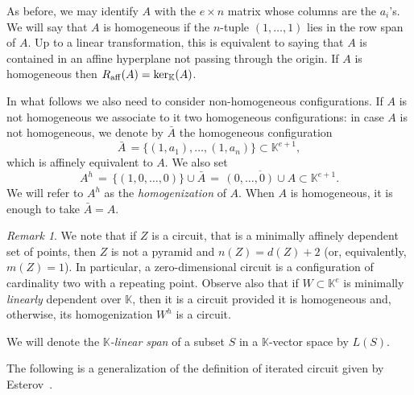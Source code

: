 \documentclass[11pt]{amsart}
\theoremstyle{plain}
\theoremstyle{definition}
\newcounter{remarks}
\theoremstyle{remark}
\newtheorem{remark}[remarks]{Remark}
\renewcommand{\k}{{\mathbb K}}
\numberwithin{equation}{section}
\begin{document}
As before, we may identify $A$ with the $e \times n$ matrix whose columns are the $a_i$'s. We will say that $A$ is homogeneous 
if the $n$-tuple $(1,\dots,1)$ lies in the row span of $A$. Up to a linear transformation, this is equivalent to saying that $A$ 
is contained in an affine hyperplane not passing through the origin. 
If $A$ is homogeneous then 
$R_{\rm aff}(A) = \ker_\k(A)$.  


In what follows we also need to consider non-homogeneous configurations.  If $A$ is not homogeneous we associate to it two homogeneous configurations:
in case $A$ is not homogeneous, we denote by $\bar{A}$ the homogeneous configuration
\begin{equation}\label{eq:overline}
\bar{A} \, = \{ (1,a_1), \dots, (1, a_{n})\} \subset \k^{e+1},
\end{equation}
which is affinely equivalent to $A$.   We also set 
\begin{equation}\label{def:Chom}
A^h  \, = \, \{(1, 0, \dots, 0)\} \cup \bar{A} \, = \, \overline{(0,\dots,0) \cup A}\subset \k^{e+1}.
\end{equation}
We will refer to $A^h$ as the {\em homogenization} of $A$. When $A$ is homogeneous, it is enough to take $\bar{A}=A$.

\begin{remark} \label{rem:circuit} We note that if $Z$ is a circuit, that is a minimally affinely dependent set of points, then $Z$ is not a pyramid and 
$n(Z) = d(Z)+2$ (or, equivalently, $m(Z)=1$).  In particular, a zero-dimensional circuit is a configuration of cardinality two with a repeating point.  
Observe also that if $W \subset \k^e$ is minimally {\em linearly} dependent over $\k$, then it is a circuit provided it is 
homogeneous and, otherwise, its homogenization $W^h$ is a circuit.
\end{remark}

We will denote  the {\em $\k$-linear span} of a subset $S$ in a $\k$-vector space by  $L(S)$.

\smallskip

The following is a generalization of the definition of iterated circuit given
	by Esterov~\cite{E1,E2}.  
	
\end{document}
